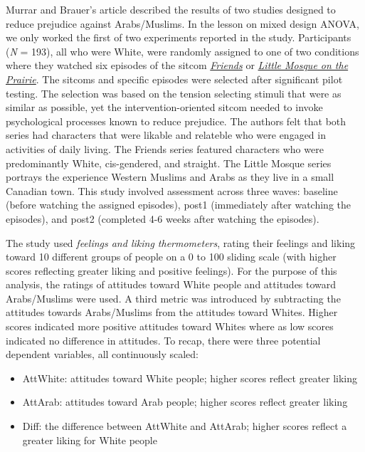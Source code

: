 \documentclass[
  11pt,
]{book}
\providecommand{\tightlist}{%
  \setlength{\itemsep}{0pt}\setlength{\parskip}{0pt}}
\begin{document}
Murrar and Brauer's \citeyearpar{murrar_entertainment-education_2018} article described the results of two studies designed to reduce prejudice against Arabs/Muslims. In the lesson on mixed design ANOVA, we only worked the first of two experiments reported in the study. Participants (\emph{N} = 193), all who were White, were randomly assigned to one of two conditions where they watched six episodes of the sitcom \href{http://www.friends-tv.org/}{\emph{Friends}} or \href{https://en.wikipedia.org/wiki/Little_Mosque_on_the_Prairie}{\emph{Little Mosque on the Prairie}}. The sitcoms and specific episodes were selected after significant pilot testing. The selection was based on the tension selecting stimuli that were as similar as possible, yet the intervention-oriented sitcom needed to invoke psychological processes known to reduce prejudice. The authors felt that both series had characters that were likable and relateble who were engaged in activities of daily living. The Friends series featured characters who were predominantly White, cis-gendered, and straight. The Little Mosque series portrays the experience Western Muslims and Arabs as they live in a small Canadian town. This study involved assessment across three waves: baseline (before watching the assigned episodes), post1 (immediately after watching the episodes), and post2 (completed 4-6 weeks after watching the episodes).

The study used \emph{feelings and liking thermometers}, rating their feelings and liking toward 10 different groups of people on a 0 to 100 sliding scale (with higher scores reflecting greater liking and positive feelings). For the purpose of this analysis, the ratings of attitudes toward White people and attitudes toward Arabs/Muslims were used. A third metric was introduced by subtracting the attitudes towards Arabs/Muslims from the attitudes toward Whites. Higher scores indicated more positive attitudes toward Whites where as low scores indicated no difference in attitudes. To recap, there were three potential dependent variables, all continuously scaled:

\begin{itemize}
\tightlist
\item
  AttWhite: attitudes toward White people; higher scores reflect greater liking
\item
  AttArab: attitudes toward Arab people; higher scores reflect greater liking
\item
  Diff: the difference between AttWhite and AttArab; higher scores reflect a greater liking for White people
\end{itemize}
\end{document}
